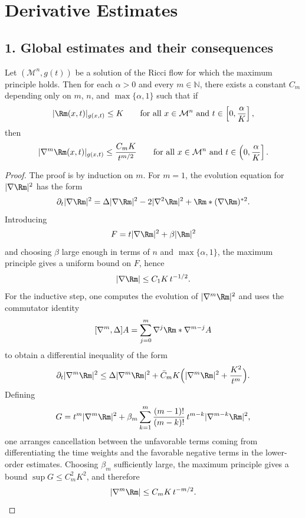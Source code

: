 \chapter{Derivative Estimates}

\section*{1. Global estimates and their consequences}

\begin{theorem}
\label{ch07-thm-global-derivative-estimates}

Let \((\mathcal M^n,g(t))\) be a solution of the Ricci flow for which the maximum principle holds. Then for each \(\alpha>0\) and every \(m\in\mathbb N\), there exists a constant \(C_m\) depending only on \(m\), \(n\), and \(\max\{\alpha,1\}\) such that if
\[
|\Rm(x,t)|_{g(x,t)}\le K
\qquad\text{for all }x\in \mathcal M^n\text{ and }t\in\left[0,\frac{\alpha}{K}\right],
\]
then
\[
|\nabla^m \Rm(x,t)|_{g(x,t)}\le \frac{C_m K}{t^{m/2}}
\qquad\text{for all }x\in \mathcal M^n\text{ and }t\in\left(0,\frac{\alpha}{K}\right].
\]
\end{theorem}

\begin{proof}
\sketch The proof is by induction on \(m\). For \(m=1\), the evolution equation for \(|\nabla \Rm|^2\) has the form
\[
\partial_t |\nabla \Rm|^2=\Delta |\nabla \Rm|^2-2|\nabla^2\Rm|^2+\Rm*(\nabla\Rm)^{*2}.
\]
Introducing
\[
F=t|\nabla \Rm|^2+\beta |\Rm|^2
\]
and choosing \(\beta\) large enough in terms of \(n\) and \(\max\{\alpha,1\}\), the maximum principle gives a uniform bound on \(F\), hence
\[
|\nabla \Rm|\le C_1K\,t^{-1/2}.
\]
For the inductive step, one computes the evolution of \(|\nabla^m\Rm|^2\) and uses the commutator identity
\[
[\nabla^m,\Delta]A=\sum_{j=0}^m \nabla^j\Rm*\nabla^{m-j}A
\]
to obtain a differential inequality of the form
\[
\partial_t |\nabla^m\Rm|^2
\le \Delta |\nabla^m\Rm|^2+\bar C_m K\Bigl(|\nabla^m\Rm|^2+\frac{K^2}{t^m}\Bigr).
\]
Defining
\[
G=t^m|\nabla^m\Rm|^2+\beta_m \sum_{k=1}^m \frac{(m-1)!}{(m-k)!}\,t^{m-k}|\nabla^{m-k}\Rm|^2,
\]
one arranges cancellation between the unfavorable terms coming from differentiating the time weights and the favorable negative terms in the lower-order estimates. Choosing \(\beta_m\) sufficiently large, the maximum principle gives a bound \(\sup G\le C_m^2K^2\), and therefore
\[
|\nabla^m\Rm|\le C_mK\,t^{-m/2}.
\]
\end{proof}

